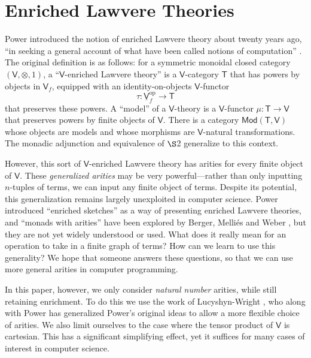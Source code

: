 \documentclass{amsart}
\theoremstyle{definition}
\newcommand{\Mod}{\mathsf{Mod}}
\newcommand{\V}{\mathsf{V}}
\newcommand{\T}{\mathsf{T}}
\newcommand{\op}{\mathrm{op}}
\newcommand{\maps}{\colon}
\begin{document}
\section{Enriched Lawvere Theories}
\label{sec:enriched_lawvere}

Power introduced the notion of enriched Lawvere theory about twenty years ago, ``in seeking a general account of what have been called notions of computation'' \cite{power}. The original definition is as follows: for a symmetric monoidal closed category $(\V,\otimes,1)$, a ``$\V$-enriched Lawvere theory'' is a $\V$-category $\T$ that has powers by objects in $\V_f$, equipped with an identity-on-objects $\V$-functor 
\[  \tau\maps \underline{\V}_f^\op \to \T \]
that preserves these powers.  A ``model'' of a $\V$-theory is a $\V$-functor $\mu\maps\T \to \V$ that preserves powers by finite objects of $\V$.  There is a category $\Mod(\T,\V)$ whose objects are models and whose morphisms are $\V$-natural transformations. The monadic adjunction and equivalence of $\S$2 generalize to this context.

However, this sort of $\V$-enriched Lawvere theory has arities for every finite object of $\V$.  These \textit{generalized arities} may be very powerful---rather than only inputting $n$-tuples of terms, we can input any finite object of terms.  Despite its potential, this generalization remains largely unexploited in computer science.   Power \cite{powsketch} introduced ``enriched sketches'' as a way of presenting enriched Lawvere theories, and ``monads with arities'' have been explored by Berger, Melli\'es and Weber \cite{bergermelliesweber}, but they are not yet widely understood or used.  What does it really mean for an operation to take in a finite graph of terms?  How can we learn to use this generality?  We hope that someone answers these questions, so that we can use more general arities in computer programming.

In this paper, however, we only consider \textit{natural number} arities, while still retaining enrichment. To do this we use the work of Lucyshyn-Wright \cite{lucyshyn-wright}, who along with Power \cite{np} has generalized Power's original ideas to allow a more flexible choice of arities.    We also limit ourselves to the case where the tensor product of $\V$ is cartesian.  This has a significant simplifying effect, yet it suffices for many cases of interest in computer science.
\end{document}
